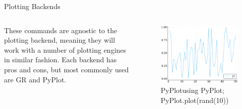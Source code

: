 \documentclass{beamer}
\begin{document}
\begin{frame}[fragile]{Plotting Backends}
	\begin{columns}
	These commands are agnostic to the plotting backend, meaning they will work with a number of plotting engines in similar fashion. Each backend has pros and cons, but most commonly used are {\color{red} GR and PyPlot}.
	
	\begin{figure}[h]
		\centering
		\includegraphics[width=.75\textwidth]{randPlotPy}
		\caption{\centering  PyPlot\newline \tiny using PyPlot; PyPlot.plot(rand(10))}
	\end{figure}


\end{columns}
\end{frame}
\end{document}
